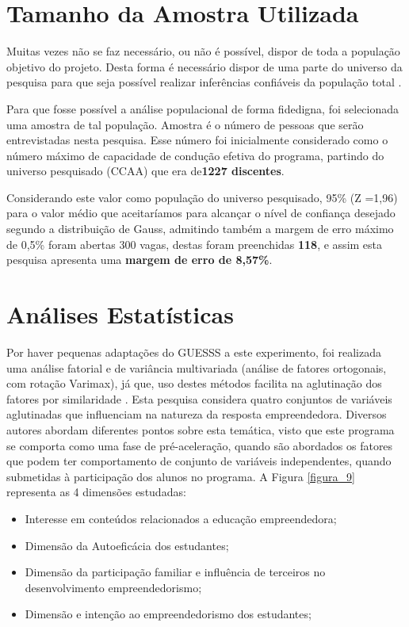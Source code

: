 \section{Tamanho da Amostra Utilizada}

Muitas vezes não se faz necessário, ou não é possível, dispor de toda a população objetivo do projeto. Desta forma é necessário dispor de uma parte do universo da pesquisa para que seja possível realizar inferências confiáveis da população total \cite{marino_manual_2003}.

Para que fosse possível a análise populacional de forma fidedigna, foi selecionada uma amostra de tal população. Amostra é o número de pessoas que serão entrevistadas nesta pesquisa. Esse número foi inicialmente considerado como o número máximo de capacidade de condução efetiva do programa, partindo do universo pesquisado (CCAA) que era de\textbf{1227 discentes}.


Considerando este valor como população do universo pesquisado, 95\% (Z =1,96) para o valor médio que aceitaríamos para alcançar o nível de confiança desejado segundo a distribuição de Gauss, admitindo também a margem de erro máximo de 0,5\% foram abertas 300 vagas, destas foram preenchidas \textbf{118}, e assim esta pesquisa apresenta uma \textbf{margem de erro de 8,57\%}.

\section{Análises Estatísticas}


Por haver pequenas adaptações do GUESSS a este experimento, foi realizada uma análise fatorial e de variância multivariada (análise de fatores ortogonais, com rotação Varimax), já que, uso destes métodos facilita na aglutinação dos fatores por similaridade \cite{hair_multivariate_2006}. Esta pesquisa considera quatro conjuntos de variáveis aglutinadas que influenciam na natureza da resposta empreendedora. Diversos autores abordam diferentes pontos sobre esta temática, visto que este programa se comporta como uma fase de pré-aceleração, quando são abordados os fatores que podem ter comportamento de conjunto de variáveis independentes, quando submetidas à participação dos alunos no programa. A Figura \ref{figura_9} representa as 4 dimensões estudadas:


\begin{itemize}
\item {Interesse em conteúdos relacionados a educação empreendedora;}
\item {Dimensão da Autoeficácia dos estudantes;}
\item {Dimensão da participação familiar e influência de terceiros no desenvolvimento empreendedorismo;}
\item {Dimensão e intenção  ao empreendedorismo dos estudantes;}
\end{itemize}



